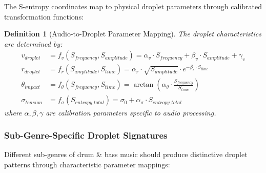 \documentclass[12pt,a4paper]{article}
\newtheorem{definition}{Definition}
\begin{document}
The S-entropy coordinates map to physical droplet parameters through calibrated transformation functions:

\begin{definition}[Audio-to-Droplet Parameter Mapping]
The droplet characteristics are determined by:
\begin{align}
v_{droplet} &= f_v(S_{frequency}, S_{amplitude}) = \alpha_v \cdot S_{frequency} + \beta_v \cdot S_{amplitude} + \gamma_v \\
r_{droplet} &= f_r(S_{amplitude}, S_{time}) = \alpha_r \cdot \sqrt{S_{amplitude}} \cdot e^{-\beta_r \cdot S_{time}} \\
\theta_{impact} &= f_\theta(S_{frequency}, S_{time}) = \arctan(\alpha_\theta \cdot \frac{S_{frequency}}{S_{time}}) \\
\sigma_{tension} &= f_\sigma(S_{entropy\_total}) = \sigma_0 + \alpha_\sigma \cdot S_{entropy\_total}
\end{align}
where $\alpha, \beta, \gamma$ are calibration parameters specific to audio processing.
\end{definition}

\subsubsection{Sub-Genre-Specific Droplet Signatures}

Different sub-genres of drum \& bass music should produce distinctive droplet patterns through characteristic parameter mappings:
\end{document}
